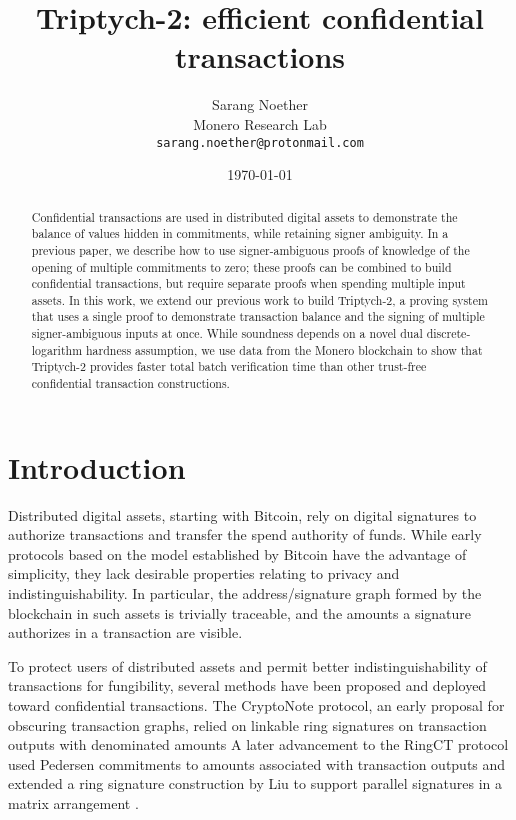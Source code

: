 \documentclass{article}
\title{Triptych-2: efficient confidential transactions}
\author{Sarang Noether \\ Monero Research Lab \\ \texttt{sarang.noether@protonmail.com}}
\date{\today}
\theoremstyle{definition}
\begin{document}
\maketitle


\begin{abstract}
Confidential transactions are used in distributed digital assets to demonstrate the balance of values hidden in commitments, while retaining signer ambiguity.
In a previous paper, we describe how to use signer-ambiguous proofs of knowledge of the opening of multiple commitments to zero; these proofs can be combined to build confidential transactions, but require separate proofs when spending multiple input assets.
In this work, we extend our previous work to build Triptych-2, a proving system that uses a single proof to demonstrate transaction balance and the signing of multiple signer-ambiguous inputs at once.
While soundness depends on a novel dual discrete-logarithm hardness assumption, we use data from the Monero blockchain to show that Triptych-2 provides faster total batch verification time than other trust-free confidential transaction constructions.
\end{abstract}


\section{Introduction}
Distributed digital assets, starting with Bitcoin, rely on digital signatures to authorize transactions and transfer the spend authority of funds.
While early protocols based on the model established by Bitcoin have the advantage of simplicity, they lack desirable properties relating to privacy and indistinguishability.
In particular, the address/signature graph formed by the blockchain in such assets is trivially traceable, and the amounts a signature authorizes in a transaction are visible.

To protect users of distributed assets and permit better indistinguishability of transactions for fungibility, several methods have been proposed and deployed toward confidential transactions.
The CryptoNote protocol, an early proposal for obscuring transaction graphs, relied on linkable ring signatures on transaction outputs with denominated amounts \cite{cryptonote}
A later advancement to the RingCT protocol used Pedersen commitments to amounts associated with transaction outputs and extended a ring signature construction by Liu  to support parallel signatures in a matrix arrangement \cite{ringct,liu}.
\end{document}
